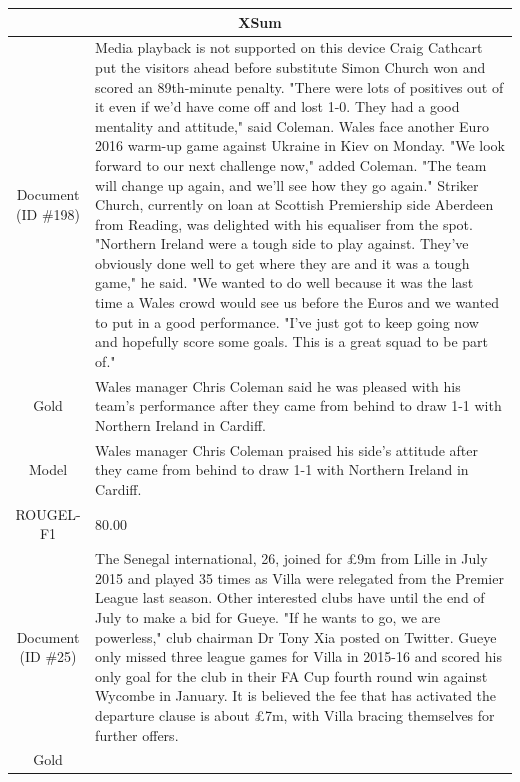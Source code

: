 \begin{table}[bth!]
\scriptsize
\centering
\renewcommand{\arraystretch}{1.3}
\begin{tabular}{c|p{}}
\hline
\multicolumn{2}{c}{XSum} \\ \hline
\makecell{Document\\(ID \#198)} & 
Media playback is not supported on this device Craig Cathcart put the visitors ahead before substitute Simon Church won and scored an 89th-minute penalty. "There were lots of positives out of it even if we'd have come off and lost 1-0. They had a good mentality and attitude," said Coleman. Wales face another Euro 2016 warm-up game against Ukraine in Kiev on Monday. "We look forward to our next challenge now," added Coleman. "The team will change up again, and we'll see how they go again." Striker Church, currently on loan at Scottish Premiership side Aberdeen from Reading, was delighted with his equaliser from the spot. "Northern Ireland were a tough side to play against. They've obviously done well to get where they are and it was a tough game," he said. "We wanted to do well because it was the last time a Wales crowd would see us before the Euros and we wanted to put in a good performance. "I've just got to keep going now and hopefully score some goals. This is a great squad to be part of."
\\ \hline
Gold & 
Wales manager Chris Coleman said he was pleased with his team's performance after they came from behind to draw 1-1 with Northern Ireland in Cardiff.
\\ \hline
Model & 
Wales manager Chris Coleman praised his side's attitude after they came from behind to draw 1-1 with Northern Ireland in Cardiff.
\\ \hline
ROUGEL-F1 & 
80.00
\\ \hline
\makecell{Document\\(ID \#25)} & 
The Senegal international, 26, joined for £9m from Lille in July 2015 and played 35 times as Villa were relegated from the Premier League last season. Other interested clubs have until the end of July to make a bid for Gueye. "If he wants to go, we are powerless," club chairman Dr Tony Xia posted on Twitter. Gueye only missed three league games for Villa in 2015-16 and scored his only goal for the club in their FA Cup fourth round win against Wycombe in January. It is believed the fee that has activated the departure clause is about £7m, with Villa bracing themselves for further offers.
\\ \hline
Gold & 

\end{tabular}
\end{table}
